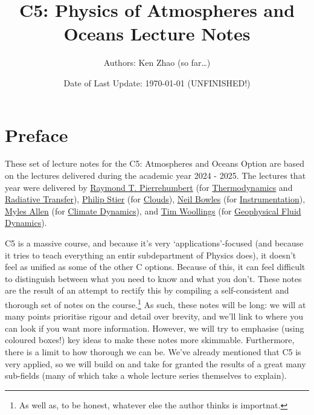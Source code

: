 \documentclass[a4paper,11pt,twoside]{report}
\title{C5: Physics of Atmospheres and Oceans Lecture Notes}
\author{Authors: Ken Zhao (so far\dots)}
\date{Date of Last Update: \today \hspace{2mm} (UNFINISHED!)}
\begin{document}
\begin{titlingpage}
\maketitle
\end{titlingpage}

\tableofcontents

\newpage

\begin{sloppypar}

\section*{Preface}

These set of lecture notes for the C5: Atmospheres and Oceans Option are based on the lectures delivered during the academic year 2024 - 2025. The lectures that year were delivered by 
\href{https://users.physics.ox.ac.uk/~pierrehumbert/}{Raymond T. Pierrehumbert} 
(for \hyperref[p Thermodynamics]{Thermodynamics} and \hyperref[Radiative Transfer]{Radiative Transfer}), 
\href{https://www.physics.ox.ac.uk/our-people/stier}{Philip Stier} 
(for \hyperref[Clouds]{Clouds}), 
\href{https://www.physics.ox.ac.uk/our-people/bowles}{Neil Bowles} 
(for \hyperref[Instrumentation]{Instrumentation}), 
\href{https://www.physics.ox.ac.uk/our-people/allenm}{Myles Allen} 
(for \hyperlink{Climate Dynamics}{Climate Dynamics}), and \href{https://www.physics.ox.ac.uk/our-people/woollings}{Tim Woollings} 
(for \hyperref[Geophysical Fluid Dynamics]{Geophysical Fluid Dynamics}).

C5 is a massive course, and because it's very `applications'-focused (and because it tries to teach everything an entir subdepartment of Physics does), it doesn't feel as unified as some of the other C options. Because of this, it can feel difficult to distinguish between what you need to know and what you don't. These notes are the result of an attempt to rectify this by compiling a self-consistent and thorough set of notes on the course.\footnote{As well as, to be honest, whatever else the author thinks is importnat.} As such, these notes will be long: we will at many points prioritise rigour and detail over brevity, and we'll link to where you can look if you want more information. However, we will try to emphasise (using coloured boxes!) key ideas to make these notes more skimmable. Furthermore, there is a limit to how thorough we can be. We've already mentioned that C5 is very applied, so we will build on and take for granted the results of a great many sub-fields (many of which take a whole lecture series themselves to explain).


\end{sloppypar}
\end{document}
